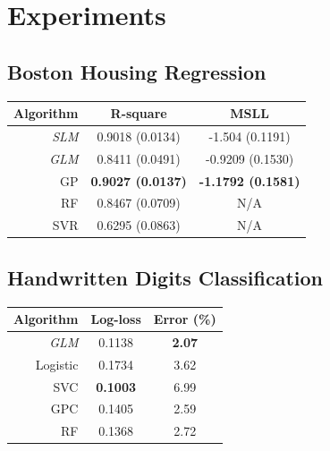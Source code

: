 \documentclass[11pt, oneside]{article}
\begin{document}
\section{Experiments}

\subsection{Boston Housing Regression}

\begin{table}[htb]

    \centering
    \begin{tabular}{r|c c}
        \textbf{Algorithm} & \textbf{R-square} & \textbf{MSLL} \\
        \hline
        \emph{SLM} & 0.9018 (0.0134) & -1.504 (0.1191) \\
        \emph{GLM} & 0.8411 (0.0491) & -0.9209 (0.1530) \\
        GP & \textbf{0.9027 (0.0137)} & \textbf{-1.1792 (0.1581)} \\
        RF & 0.8467 (0.0709) & N/A \\ 
        SVR & 0.6295 (0.0863) & N/A \\
        \hline
    \end{tabular}

\end{table}

\subsection{Handwritten Digits Classification}

\begin{table}[htb]

    \centering
    \begin{tabular}{r|c c}
        \textbf{Algorithm} & \textbf{Log-loss} & \textbf{Error (\%)} \\
        \hline
        \emph{GLM} & 0.1138 & \textbf{2.07} \\
        Logistic & 0.1734 & 3.62 \\
        SVC & \textbf{0.1003} & 6.99 \\
        GPC &  0.1405 & 2.59 \\
        RF & 0.1368 & 2.72 \\
        \hline
    \end{tabular}

\end{table}
\end{document}
